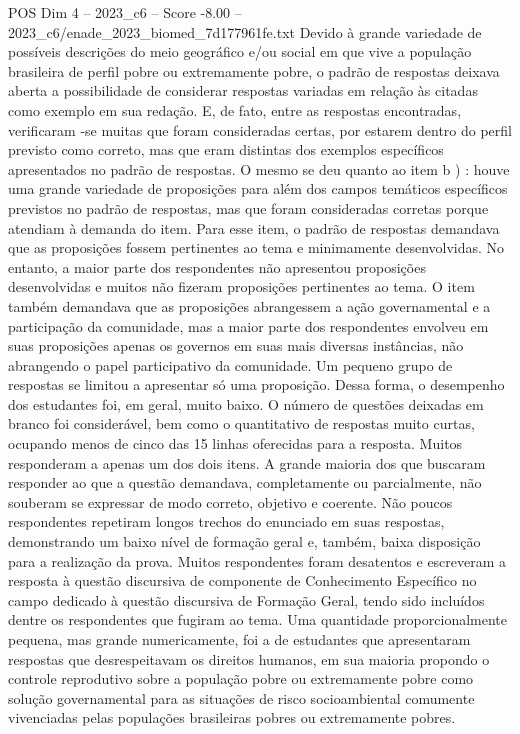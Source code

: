 \begin{textsample}{POS Dim 4 – 2023\_c6 – Score -8.00 – 2023\_c6/enade\_2023\_biomed\_7d177961fe.txt}
Devido à grande variedade de possíveis descrições do meio geográfico e/ou social em que vive a população brasileira de perfil pobre ou extremamente pobre, o padrão de respostas deixava aberta a possibilidade de considerar respostas variadas em relação às citadas como exemplo em sua redação.
E, de fato, entre as respostas encontradas, verificaram -se muitas que foram consideradas certas, por estarem dentro do perfil previsto como correto, mas que eram distintas dos exemplos específicos apresentados no padrão de respostas.
O mesmo se deu quanto ao item b ) : houve uma grande variedade de proposições para além dos campos temáticos específicos previstos no padrão de respostas, mas que foram consideradas corretas porque atendiam à demanda do item.
Para esse item, o padrão de respostas demandava que as proposições fossem pertinentes ao tema e minimamente desenvolvidas.
No entanto, a maior parte dos respondentes não apresentou proposições desenvolvidas e muitos não fizeram proposições pertinentes ao tema.
O item também demandava que as proposições abrangessem a ação governamental e a participação da comunidade, mas a maior parte dos respondentes envolveu em suas proposições apenas os governos em suas mais diversas instâncias, não abrangendo o papel participativo da comunidade.
Um pequeno grupo de respostas se limitou a apresentar só uma proposição.
Dessa forma, o desempenho dos estudantes foi, em geral, muito baixo.
O número de questões deixadas em branco foi considerável, bem como o quantitativo de respostas muito curtas, ocupando menos de cinco das 15 linhas oferecidas para a resposta.
Muitos responderam a apenas um dos dois itens.
A grande maioria dos que buscaram responder ao que a questão demandava, completamente ou parcialmente, não souberam se expressar de modo correto, objetivo e coerente.
Não poucos respondentes repetiram longos trechos do enunciado em suas respostas, demonstrando um baixo nível de formação geral e, também, baixa disposição para a realização da prova.
Muitos respondentes foram desatentos e escreveram a resposta à questão discursiva de componente de Conhecimento Específico no campo dedicado à questão discursiva de Formação Geral, tendo sido incluídos dentre os respondentes que fugiram ao tema.
Uma quantidade proporcionalmente pequena, mas grande numericamente, foi a de estudantes que apresentaram respostas que desrespeitavam os direitos humanos, em sua maioria propondo o controle reprodutivo sobre a população pobre ou extremamente pobre como solução governamental para as situações de risco socioambiental comumente vivenciadas pelas populações brasileiras pobres ou extremamente pobres.

\end{textsample}
